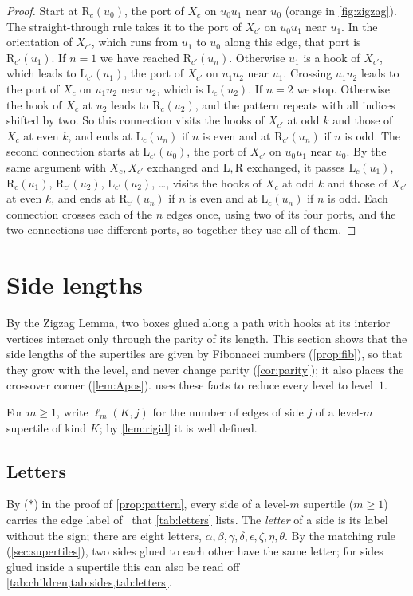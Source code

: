 \documentclass[11pt]{amsart}
\theoremstyle{definition}
\theoremstyle{remark}
\newcommand{\Lp}{\mathrm L}
\newcommand{\Rp}{\mathrm R}
\begin{document}
\begin{proof}
Start at $\Rp_c(u_0)$, the port of $X_c$ on $u_0u_1$ near $u_0$ (orange in \cref{fig:zigzag}). The straight-through
rule takes it to the port of $X_{c'}$ on $u_0u_1$ near $u_1$. In the orientation of $X_{c'}$, which runs from $u_1$ to
$u_0$ along this edge, that port is $\Rp_{c'}(u_1)$. If $n=1$ we have reached $\Rp_{c'}(u_n)$. Otherwise $u_1$ is a hook
of $X_{c'}$, which leads to $\Lp_{c'}(u_1)$, the port of $X_{c'}$ on $u_1u_2$ near $u_1$. Crossing $u_1u_2$ leads to the
port of $X_c$ on $u_1u_2$ near $u_2$, which is $\Lp_c(u_2)$. If $n=2$ we stop. Otherwise the hook of $X_c$ at $u_2$ leads
to $\Rp_c(u_2)$, and the pattern repeats with all indices shifted by two. So this connection visits the hooks of
$X_{c'}$ at odd $k$ and those of $X_c$ at even $k$, and ends at $\Lp_c(u_n)$ if $n$ is even and at $\Rp_{c'}(u_n)$ if
$n$ is odd. The second connection starts at $\Lp_{c'}(u_0)$, the port of $X_{c'}$ on $u_0u_1$ near $u_0$. By the same
argument with $X_c,X_{c'}$ exchanged and $\Lp,\Rp$ exchanged, it passes $\Lp_c(u_1)$, $\Rp_c(u_1)$, $\Rp_{c'}(u_2)$,
$\Lp_{c'}(u_2)$, \dots, visits the hooks of $X_c$ at odd $k$ and those of $X_{c'}$ at even $k$, and ends at
$\Rp_{c'}(u_n)$ if $n$ is even and at $\Lp_c(u_n)$ if $n$ is odd. Each connection crosses each of the $n$ edges once,
using two of its four ports, and the two connections use different ports, so together they use all of them.
\end{proof}

\section{Side lengths}\label{sec:lengths}

By the Zigzag Lemma, two boxes glued along a path with hooks at its interior vertices interact only through the parity
of its length. This section shows that the side lengths of the supertiles are given by Fibonacci numbers
(\cref{prop:fib}), so that they grow with the level, and never change parity (\cref{cor:parity}); it also places the crossover
corner (\cref{lem:Apos}).  uses these facts to reduce every level to level~$1$.

For $m\ge1$, write $\ell_m(K,j)$ for the number of edges of side $j$ of a level-$m$ supertile of kind $K$; by
\cref{lem:rigid} it is well defined.

\subsection{Letters}
By ($\ast$) in the proof of \cref{prop:pattern}, every side of a level-$m$ supertile ($m\ge1$) carries the edge label
of~\cite[Fig.~4.2]{SMKGS-spectre} that \cref{tab:letters} lists. The \emph{letter} of a side is its label without the
sign; there are eight letters, $\alpha,\beta,\gamma,\delta,\epsilon,\zeta,\eta,\theta$. By the matching rule
(\cref{sec:supertiles}), two sides glued to each other have the same letter; for sides glued inside a supertile this
can also be read off \cref{tab:children,tab:sides,tab:letters}.
\end{document}
